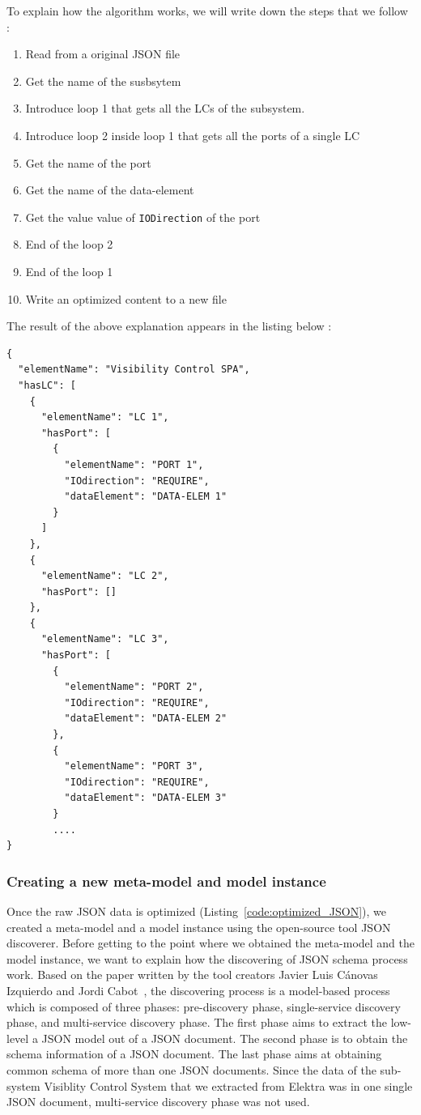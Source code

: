 To explain how the algorithm works, we will write down the steps that we follow :
\begin{enumerate}
\item Read from a original JSON file
\item Get the name of the susbsytem
\item Introduce loop 1 that gets all the LCs of the subsystem.
\item Introduce loop 2 inside loop 1 that gets all the ports of a single LC
\item Get the name of the port
\item Get the name of the data-element
\item Get the value value of \texttt{IODirection} of the port
\item End of the loop 2 
\item End of the loop 1
\item Write an optimized content to a new file
\end{enumerate}

The result of the above explanation appears in the listing below :

\begin{lstlisting}[caption=A sample part of the optimized JSON content,label=code:optimized_JSON]
{
  "elementName": "Visibility Control SPA",
  "hasLC": [
    {
      "elementName": "LC 1",
      "hasPort": [
        {
          "elementName": "PORT 1",
          "IOdirection": "REQUIRE",
          "dataElement": "DATA-ELEM 1"
        }
      ]
    },
    {
      "elementName": "LC 2",
      "hasPort": []
    },
    {
      "elementName": "LC 3",
      "hasPort": [
        {
          "elementName": "PORT 2",
          "IOdirection": "REQUIRE",
          "dataElement": "DATA-ELEM 2"
        },
        {
          "elementName": "PORT 3",
          "IOdirection": "REQUIRE",
          "dataElement": "DATA-ELEM 3"
        }
        ....
}
\end{lstlisting}


\subsubsection{Creating a new meta-model and model instance}
Once the raw JSON data is optimized (Listing~\ref{code:optimized_JSON}), we created a meta-model and a model instance using the open-source tool JSON discoverer. Before getting to the point where we obtained the meta-model and the model instance, we want to explain how the discovering of JSON schema process work. Based on the paper written by the tool creators Javier Luis Cánovas Izquierdo and Jordi Cabot~\cite{Canovas}, the discovering process is a model-based process which is composed of three phases:  pre-discovery phase, single-service discovery phase, and multi-service discovery
phase. The first phase aims to extract the low-level a JSON model out of a JSON document. The second phase is to obtain the schema information of a JSON document. The last phase aims at obtaining common schema of more than one JSON documents. Since the data of the sub-system Visiblity Control System that we extracted from Elektra was in one single JSON document, multi-service discovery phase was not used. \\

